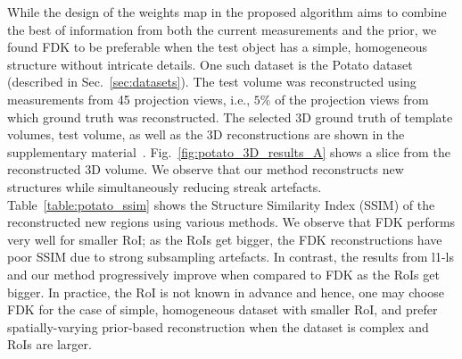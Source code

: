 \documentclass[journal]{IEEEtran}
\begin{document}
While the design of the weights map in the proposed algorithm aims to
combine the best of information from both the current measurements and
the prior, we found FDK to be preferable when the test object has a
simple, homogeneous structure without intricate details. One such
dataset is the Potato dataset (described in
Sec.~\ref{sec:datasets}). The test volume was reconstructed using
measurements from 45 projection views, i.e., $5\%$ of the projection
views from which ground truth was reconstructed. The selected 3D
ground truth of template volumes, test volume, as well as the 3D
reconstructions are shown in the supplementary
material~\cite{supp_paper}. Fig.~\ref{fig:potato_3D_results_A} shows a
slice from the reconstructed 3D volume. We observe that our method
reconstructs new structures while simultaneously reducing streak
artefacts. Table~\ref{table:potato_ssim} shows the Structure Similarity
Index (SSIM) of the reconstructed new regions using various
methods. We observe that FDK performs very well for smaller RoI;
as the RoIs get bigger, the FDK reconstructions have poor SSIM due to
strong subsampling artefacts. In contrast, the results from l1-ls and
our method progressively improve when compared to FDK as the RoIs get
bigger. In practice, the RoI is not known in advance and hence, one
may choose FDK for the case of simple, homogeneous dataset with
smaller RoI, and prefer spatially-varying prior-based reconstruction
when the dataset is complex and RoIs are larger.

\end{document}

